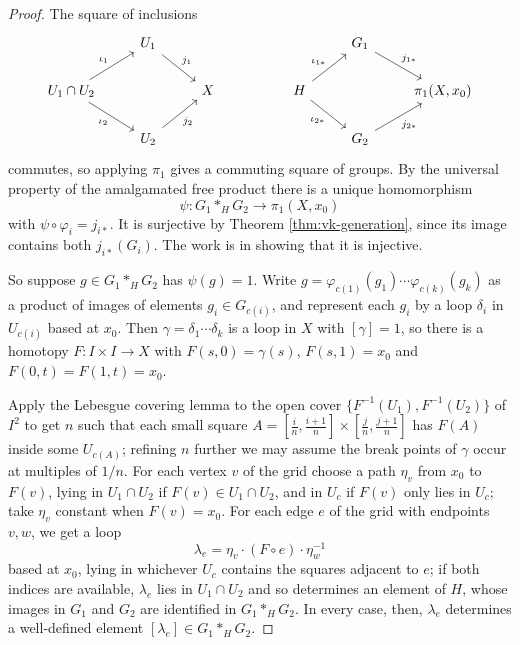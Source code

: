 \begin{proof}
	The square of inclusions
	\[\begin{tikzcd}
		& {U_1} \arrow[rd, "{j_1}"] & & & & {G_1} \arrow[rd, "{j_{1*}}"] & \\
		{U_1\cap U_2} \arrow[ru, "{\iota_1}"] \arrow[rd, "{\iota_2}"'] & & X & & H \arrow[ru, "{\iota_{1*}}"] \arrow[rd, "{\iota_{2*}}"'] & & {\pi_1(X,x_0)} \\
		& {U_2} \arrow[ru, "{j_2}"'] & & & & {G_2} \arrow[ru, "{j_{2*}}"'] &
	\end{tikzcd}\]
	commutes, so applying $\pi_1$ gives a commuting square of groups. By the universal property of the amalgamated free product there is a unique homomorphism
	$$
	\psi: G_1 *_H G_2 \to \pi_1(X, x_0)
	$$
	with $\psi \circ \varphi_i = j_{i*}$. It is surjective by Theorem \ref{thm:vk-generation}, since its image contains both $j_{i*}(G_i)$. The work is in showing that it is injective.

	So suppose $g \in G_1 *_H G_2$ has $\psi(g) = 1$. Write $g = \varphi_{c(1)}(g_1)\cdots\varphi_{c(k)}(g_k)$ as a product of images of elements $g_i \in G_{c(i)}$, and represent each $g_i$ by a loop $\delta_i$ in $U_{c(i)}$ based at $x_0$. Then $\gamma = \delta_1 \cdots \delta_k$ is a loop in $X$ with $[\gamma] = 1$, so there is a homotopy $F: I \times I \to X$ with $F(s, 0) = \gamma(s)$, $F(s,1) = x_0$ and $F(0,t) = F(1,t) = x_0$.

	Apply the Lebesgue covering lemma to the open cover $\{F^{-1}(U_1), F^{-1}(U_2)\}$ of $I^2$ to get $n$ such that each small square $A = [\frac{i}{n},\frac{i+1}{n}]\times[\frac{j}{n},\frac{j+1}{n}]$ has $F(A)$ inside some $U_{c(A)}$; refining $n$ further we may assume the break points of $\gamma$ occur at multiples of $1/n$. For each vertex $v$ of the grid choose a path $\eta_v$ from $x_0$ to $F(v)$, lying in $U_1 \cap U_2$ if $F(v) \in U_1\cap U_2$, and in $U_{c}$ if $F(v)$ only lies in $U_{c}$; take $\eta_v$ constant when $F(v) = x_0$. For each edge $e$ of the grid with endpoints $v, w$, we get a loop
	$$
	\lambda_e = \eta_v \cdot (F\circ e)\cdot \eta_w^{-1}
	$$
	based at $x_0$, lying in whichever $U_c$ contains the squares adjacent to $e$; if both indices are available, $\lambda_e$ lies in $U_1 \cap U_2$ and so determines an element of $H$, whose images in $G_1$ and $G_2$ are identified in $G_1 *_H G_2$. In every case, then, $\lambda_e$ determines a well-defined element $[\lambda_e] \in G_1 *_H G_2$.


\end{proof}
